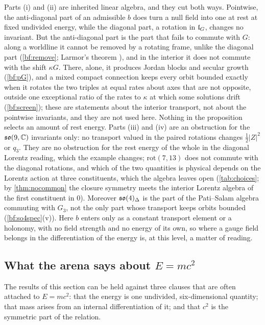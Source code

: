 Parts (i) and (ii) are inherited linear algebra, and they cut both ways. Pointwise, the anti-diagonal part of an admissible $b$ does turn a null
field into one at rest at fixed undivided energy, while the diagonal part, a rotation in $\mathfrak l_G$, changes no invariant. But the anti-diagonal part is
the part that fails to commute with $G$: along a worldline it cannot be removed by a rotating frame, unlike the diagonal part (\cref{bf:remove}; Larmor's theorem
\cite{Larmor1897}), and in the interior it does not commute with the shift $\kappa G$. There, alone, it produces Jordan blocks and secular growth
(\cref{bf:pG}), and a mixed compact connection keeps every orbit bounded exactly when it rotates the two triples at equal rates about axes that
are not opposite, outside one exceptional ratio of the rates to $\kappa$ at which some solutions drift (\cref{bf:screen}); these are statements
about the interior transport, not about the pointwise invariants, and they are not used here. Nothing in the proposition selects an amount of rest energy. Parts (iii) and (iv) are an
obstruction for the $\mathfrak{so}(9,\mathbb{C})$ invariants only: no transport valued in the paired rotations changes $\tfrac12|Z|^2$ or $q_3$. They are no obstruction
for the rest energy of the whole in the diagonal Lorentz reading, which the example changes; $\mathrm{rot}(7,13)$ does not commute with the diagonal
rotations, and which of the two quantities is physical depends on the Lorentz action at three constituents, which the algebra leaves open
(\cref{tab:choices}; by \cref{thm:nocommon} the closure symmetry meets the interior Lorentz algebra of the first constituent in $0$). Moreover
$\mathfrak{so}(4)_\Delta$ is the part of the Pati--Salam algebra commuting with $G_3$, not the only part whose transport keeps orbits bounded (\cref{bf:so4spec}(v)). Here $b$ enters
only as a constant transport element or a holonomy, with no field strength and no energy of its own, so where a gauge field belongs in the
differentiation of the energy is, at this level, a matter of reading.

\subsection{\texorpdfstring{What the arena says about $E=mc^2$}{What the arena says about E=mc2}}
\label{sec:energy-readings}

The results of this section can be held against three clauses that are often attached to $E=mc^2$: that the energy is one undivided,
six-dimensional quantity; that mass arises from an internal differentiation of it; and that $c^2$ is the symmetric part of the relation.

